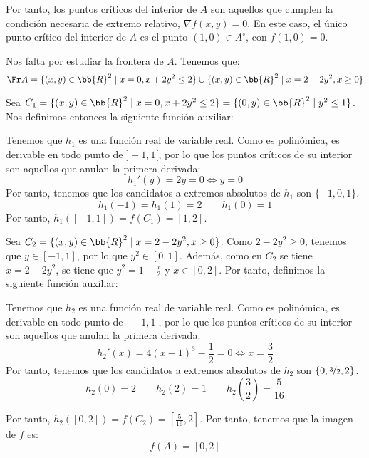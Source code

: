 \begin{ejercicio}
    Por tanto, los puntos críticos del interior de $A$ son aquellos que
    cumplen la condición necesaria de extremo relativo, $\nabla f(x,y)=0$. En este caso, el único punto crítico del interior de $A$ es el punto $(1,0)\in A^\circ$,
    con $f(1,0)=0$.

    Nos falta por estudiar la frontera de $A$. Tenemos que:
    \begin{equation*}
        \Fr A = \{(x,y)\in \bb{R}^2\mid x=0, x+2y^2\leq 2\} \cup \{(x,y)\in \bb{R}^2\mid x=2-2y^2, x\geq 0\}
    \end{equation*}

    Sea $C_1=\{(x,y)\in \bb{R}^2\mid x=0, x+2y^2\leq 2\}=\{(0,y)\in \bb{R}^2\mid y^2\leq 1\}$.
    Nos definimos entonces la siguiente función auxiliar:

    Tenemos que $h_1$ es una función real de variable real. Como es polinómica, es derivable en todo punto de $]-1,1[$, por lo que los puntos críticos de su interior son aquellos que anulan la primera derivada:
    \begin{equation*}
        h_1'(y) = 2y = 0 \Longleftrightarrow y=0
    \end{equation*}
    Por tanto, tenemos que los candidatos a extremos absolutos de $h_1$ son $\{-1,0,1\}$.
    \begin{equation*}
        h_1(-1)=h_1(1)=2 \qquad h_1(0)=1
    \end{equation*}
    Por tanto, $h_1\left(\left[-1,1\right]\right)=f(C_1) = [1,2]$.

    Sea $C_2=\{(x,y)\in \bb{R}^2\mid x=2-2y^2, x\geq 0\}$. Como $2-2y^2\geq 0$, tenemos que $y\in \left[-1,1\right]$, por lo que $y^2\in [0,1]$. Además, como en $C_2$ se tiene $x=2-2y^2$, se tiene que $y^2=1-\frac{x}{2}$ y $x\in [0,2]$. Por tanto, definimos la siguiente función auxiliar:

    Tenemos que $h_2$ es una función real de variable real. Como es polinómica, es derivable en todo punto de $]-1,1[$, por lo que los puntos críticos de su interior son aquellos que anulan la primera derivada:
    \begin{equation*}
        h_2'(x) = 4(x-1)^3 - \frac{1}{2} = 0 \Longleftrightarrow x=\frac{3}{2}
    \end{equation*}
    Por tanto, tenemos que los candidatos a extremos absolutos de $h_2$ son $\{0,\nicefrac{3}{2},2\}$.
    \begin{equation*}
        h_2(0)=2 \qquad h_2(2)=1 \qquad h_2\left(\frac{3}{2}\right) = \frac{5}{16}
    \end{equation*}

    Por tanto, $h_2\left(\left[0,2\right]\right)=f(C_2) = \left[\frac{5}{16}, 2\right]$. Por tanto, tenemos que la imagen de $f$ es:
    \begin{equation*}
        f(A) = \left[0, 2\right]
    \end{equation*}
\end{ejercicio}